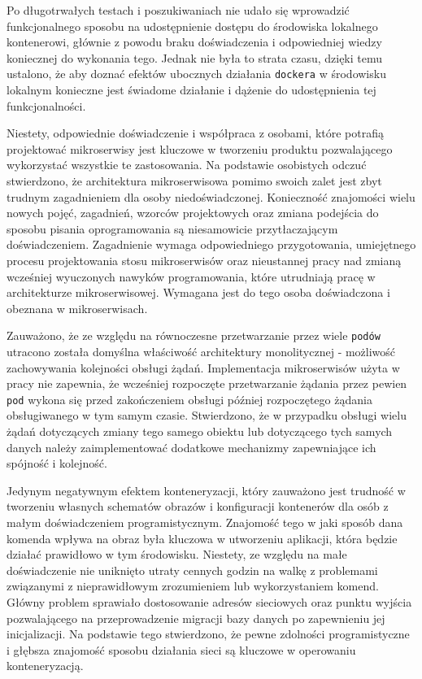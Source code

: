 \documentclass[12pt,twoside]{article}
\begin{document}
Po długotrwałych testach i poszukiwaniach nie udało się wprowadzić funkcjonalnego sposobu na udostępnienie dostępu do środowiska lokalnego kontenerowi, głównie z powodu braku doświadczenia i odpowiedniej wiedzy koniecznej do wykonania tego. Jednak nie była to strata czasu, dzięki temu ustalono, że aby doznać efektów ubocznych działania \texttt{dockera} w środowisku lokalnym konieczne jest świadome działanie i dążenie do udostępnienia tej funkcjonalności.

Niestety, odpowiednie doświadczenie i współpraca z osobami, które potrafią projektować mikroserwisy jest kluczowe w tworzeniu produktu pozwalającego wykorzystać wszystkie te zastosowania. Na podstawie osobistych odczuć stwierdzono, że architektura mikroserwisowa pomimo swoich zalet jest zbyt trudnym zagadnieniem dla osoby niedoświadczonej. Konieczność znajomości wielu nowych pojęć, zagadnień, wzorców projektowych oraz zmiana podejścia do sposobu pisania oprogramowania są niesamowicie przytłaczającym doświadczeniem. Zagadnienie wymaga odpowiedniego przygotowania, umiejętnego procesu projektowania stosu mikroserwisów oraz nieustannej pracy nad zmianą wcześniej wyuczonych nawyków programowania, które utrudniają pracę w architekturze mikroserwisowej. Wymagana jest do tego osoba doświadczona i obeznana w mikroserwisach.

Zauważono, że ze względu na równoczesne przetwarzanie przez wiele \texttt{podów} utracono została domyślna właściwość architektury monolitycznej - możliwość zachowywania kolejności obsługi żądań. Implementacja mikroserwisów użyta w pracy nie zapewnia, że wcześniej rozpoczęte przetwarzanie żądania przez pewien \texttt{pod} wykona się przed zakończeniem obsługi później rozpoczętego żądania obsługiwanego w tym samym czasie. Stwierdzono, że w przypadku obsługi wielu żądań dotyczących zmiany tego samego obiektu lub dotyczącego tych samych danych należy zaimplementować dodatkowe mechanizmy zapewniające ich spójność i kolejność.

Jedynym negatywnym efektem konteneryzacji, który zauważono jest trudność w tworzeniu własnych schematów obrazów i konfiguracji kontenerów dla osób z małym doświadczeniem programistycznym. Znajomość tego w jaki sposób dana komenda wpływa na obraz była kluczowa w utworzeniu aplikacji, która będzie działać prawidłowo w tym środowisku. Niestety, ze względu na małe doświadczenie nie uniknięto utraty cennych godzin na walkę z problemami związanymi z nieprawidłowym zrozumieniem lub wykorzystaniem komend. Główny problem sprawiało dostosowanie adresów sieciowych oraz punktu wyjścia pozwalającego na przeprowadzenie migracji bazy danych po zapewnieniu jej inicjalizacji. Na podstawie tego stwierdzono, że pewne zdolności programistyczne i głębsza znajomość sposobu działania sieci są kluczowe w operowaniu konteneryzacją.
\end{document}
